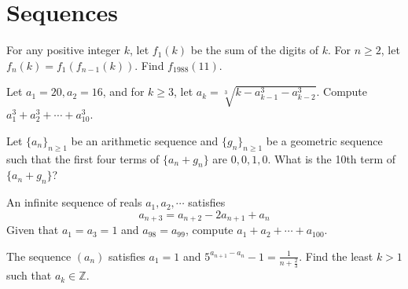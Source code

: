 \documentclass[11pt]{scrartcl}
\begin{document}
\section{Sequences}
\begin{example}
  [AIME 1988]
  For any positive integer $k$, let $f_1(k)$ be the sum of the digits of $k$.
  For $n\ge 2$, let $f_n(k)=f_1(f_{n-1}(k))$. Find $f_{1988}(11)$.
\end{example}
\begin{soln}
\end{soln}
\begin{example}
  [Pumac 2016]
  Let $a_1=20, a_2=16$, and for $k\ge 3$, let $a_k=\sqrt[3]{k-a_{k-1}^3-a_{k-2}^3}$.
  Compute $a_1^3+a_2^3+\cdots+a_{10}^3$.
\end{example}
\begin{soln}
\end{soln}
\begin{example}
  [HMMT 2013]
  Let $\{a_n\}_{n\ge 1}$ be an arithmetic sequence and $\{g_n\}_{n\ge 1}$ be a
  geometric sequence such that the first four terms of $\{a_n+g_n\}$ are
  $0,0,1,0$. What is the 10th term of $\{a_n+g_n\}$?
\end{example}
\begin{soln}
\end{soln}
\begin{example}
  [HMMT 2016]
  An infinite sequence of reals $a_1,a_2,\cdots$ satisfies
  $$a_{n+3}=a_{n+2}-2a_{n+1}+a_n$$
  Given that $a_1=a_3=1$ and $a_{98}=a_{99}$, compute $a_1+a_2+\cdots +a_{100}$.
\end{example}
\begin{soln}
\end{soln}
\begin{example}
  [AIME 2009]
  The sequence $(a_n)$ satisfies $a_1=1$ and $5^{a_{n+1}-a_n}-1=\frac{1}{n+\frac{2}{3}}$.
  Find the least $k>1$ such that $a_k\in\mathbb{Z}$.
\end{example}
\begin{soln}
\end{soln}
\begin{example}
  [PUMAC]
\end{example}
\begin{soln}
\end{soln}
\begin{example}
\end{example}
\begin{soln}
\end{soln}
\begin{example}
\end{example}
\begin{soln}
\end{soln}
\begin{example}
\end{example}
\begin{soln}
\end{soln}
\begin{example}
\end{example}
\begin{soln}
\end{soln}
\end{document}
